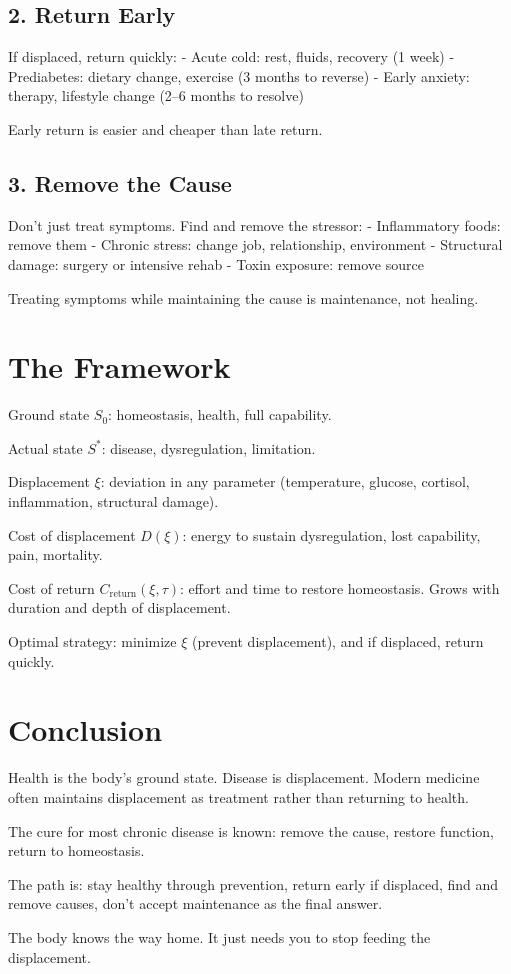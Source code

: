 \documentclass[12pt]{article}
\begin{document}
\subsection{2. Return Early}

If displaced, return quickly:
- Acute cold: rest, fluids, recovery (1 week)
- Prediabetes: dietary change, exercise (3 months to reverse)
- Early anxiety: therapy, lifestyle change (2–6 months to resolve)

Early return is easier and cheaper than late return.

\subsection{3. Remove the Cause}

Don't just treat symptoms. Find and remove the stressor:
- Inflammatory foods: remove them
- Chronic stress: change job, relationship, environment
- Structural damage: surgery or intensive rehab
- Toxin exposure: remove source

Treating symptoms while maintaining the cause is maintenance, not healing.

\section{The Framework}

Ground state $S_0$: homeostasis, health, full capability.

Actual state $S^*$: disease, dysregulation, limitation.

Displacement $\xi$: deviation in any parameter (temperature, glucose, cortisol, inflammation, structural damage).

Cost of displacement $D(\xi)$: energy to sustain dysregulation, lost capability, pain, mortality.

Cost of return $C_{\text{return}}(\xi, \tau)$: effort and time to restore homeostasis. Grows with duration and depth of displacement.

Optimal strategy: minimize $\xi$ (prevent displacement), and if displaced, return quickly.

\section{Conclusion}

Health is the body's ground state. Disease is displacement. Modern medicine often maintains displacement as treatment rather than returning to health.

The cure for most chronic disease is known: remove the cause, restore function, return to homeostasis.

The path is: stay healthy through prevention, return early if displaced, find and remove causes, don't accept maintenance as the final answer.

The body knows the way home. It just needs you to stop feeding the displacement.
\end{document}
